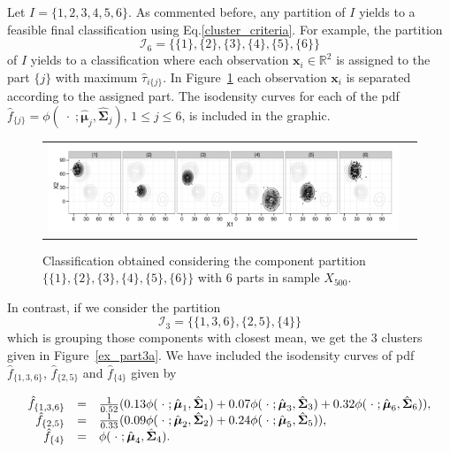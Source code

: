 \documentclass[10pt, a4paper]{article}
\newcommand{\m}[1]{\boldsymbol{#1}}
\begin{document}
Let $I = \{1,2,3,4,5,6\}$. As commented before, any partition of $I$ yields to a feasible final classification using Eq.\ref{cluster_criteria}. For example, the partition 
\[
\mathcal{I}_6 = \{\{1\},\{2\},\{3\},\{4\},\{5\},\{6\}\}
\]
of $I$ yields to a classification where each observation $\m x_i \in \mathbb{R}^2$ is  assigned to the part $\{j\}$ with maximum $\hat{\tau}_{i\{j\}}$. In Figure~\ref{ex_part6} each observation $\m x_i$ is separated according to the assigned part. The isodensity curves for each of the pdf $\hat{f}_{\{j\}} = \phi(\;\cdot\; ; \hat{\m\mu}_j, \hat{\m\Sigma}_j)$, $1\leq j \leq 6$, is included in the graphic. 

\begin{figure}[!h]
\begin{center}
\begin{tabular}{cc}
  \includegraphics[trim=0cm 0cm 0cm 0cm,width=\textwidth]{partition-example-part6.pdf} \\
 \end{tabular}
 \caption{Classification obtained considering the component partition $\{ \{1\}, \{2\}, \{3\}, \{4\}, \{5\}, \{6\} \}$ with 6 parts in sample $X_{500}$.}\label{ex_part6}
\end{center}
\end{figure}

In contrast, if we consider the partition
\[\mathcal{I}_3 = \{\{1, 3, 6\},\{2, 5\},\{4\}\}\]
which is grouping those components with closest mean, we get the 3 clusters given in Figure~\ref{ex_part3a}. We have included the isodensity curves of pdf $\hat{f}_{\{1,3,6\}}$, $\hat{f}_{\{2, 5\}}$ and $\hat{f}_{\{4\}}$ given by

\[ 
\begin{array}{r c l}
\hat{f}_{\{1,3,6\}} & = & \frac{1}{0.52}(0.13 \phi(\;\cdot\; ; \hat{\m\mu}_1, \hat{\m\Sigma}_1) + 0.07 \phi(\;\cdot\; ; \hat{\m\mu}_3, \hat{\m\Sigma}_3) + 0.32 \phi(\;\cdot\; ; \hat{\m\mu}_6, \hat{\m\Sigma}_6)), \\
\hat{f}_{\{2, 5\}} & = &  \frac{1}{0.33}(0.09 \phi(\;\cdot\; ; \hat{\m\mu}_2, \hat{\m\Sigma}_2) + 0.24 \phi(\;\cdot\; ; \hat{\m\mu}_5, \hat{\m\Sigma}_5)), \\
\hat{f}_{\{4\}} & = &\phi(\;\cdot\; ; \hat{\m\mu}_4, \hat{\m\Sigma}_4).
\end{array} 
\]
  
\end{document}
